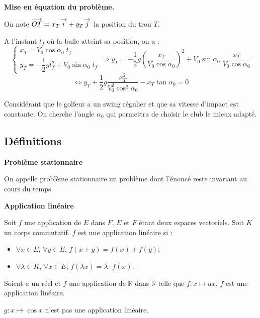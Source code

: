 \documentclass[10pt,fleqn]{article} %
\begin{document}
\textbf{Mise en équation du problème.}


On note $\overrightarrow{OT}=x_T\overrightarrow{i} + y_T\overrightarrow{j}$ la position du trou $T$. 

A l'instant $t_f$ où la balle atteint sa position, on a : 
$$
\left\{ 
\begin{array}{l}
x_T = V_0 \cos\alpha_0 \; t_f \\ 
y_T = -\dfrac{1}{2}gt_f^2 +  V_0 \sin\alpha_0 \; t_f
\end{array}
\right.
\Longrightarrow 
y_T = -\dfrac{1}{2}g \left(\dfrac{x_T}{V_0 \cos\alpha_0}\right) ^2 + V_0 \sin\alpha_0 \; \dfrac{x_T}{V_0 \cos\alpha_0}
$$
$$
\Longleftrightarrow 
y_T+\dfrac{1}{2}g \dfrac{x_T^2}{V_0^2 \cos^2\alpha_0} - x_T \tan\alpha_0 = 0
$$

Considérant que le golfeur a un swing régulier et que sa vitesse d'impact est constante. On cherche l'angle $\alpha_0$ qui permettra de choisir le club le mieux adapté.

\subsection{Définitions}

\begin{defi}
\textbf{Problème stationnaire}

On appelle problème stationnaire un problème dont l'énoncé reste invariant au cours du temps.
\end{defi}


\begin{defi}
\textbf{Application linéaire}

Soit $f$ une application de $E$ dans $F$, $E$ et $F$ étant deux espaces vectoriels. Soit $K$ un corps commutatif. $f$ est une application linéaire si :
\begin{itemize}
\item $\forall x \in E$, $\forall y \in E$, $f(x+y)=f(x)+f(y)$;
\item $\forall \lambda \in K$, $\forall x \in E$, $f(\lambda x) =\lambda \cdot f(x)$.
\end{itemize}
\end{defi}

\begin{exemple}
Soient $a$ un réel et $f$ une application de $\mathbb{R}$ dans $\mathbb{R}$ telle que $f:x\mapsto ax $. $f$ est une application linéaire.

$g:x\mapsto \cos x$ n'est pas une application linéaire.

\end{exemple}
\end{document}
